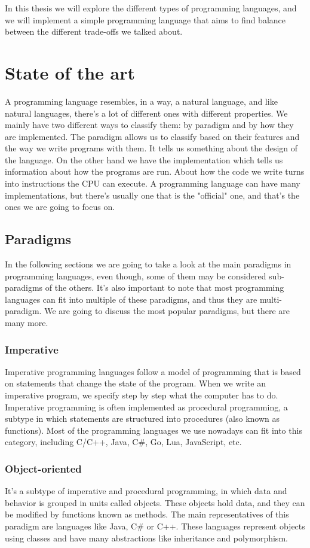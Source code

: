 ﻿\documentclass[10pt,a4paper,twocolumn,twoside]{article}
\begin{document}
In this thesis we will explore the different types of programming languages, and
we will implement a simple programming language that aims to find balance 
between the different trade-offs we talked about.

\section{State of the art}
A programming language resembles, in a way, a natural language, and like natural
languages, there's a lot of different ones with different properties. We mainly
have two different ways to classify them: by paradigm and by how they are
implemented. The paradigm allows us to classify based on their features and the
way we write programs with them. It tells us something about the design of the
language. On the other hand we have the implementation which tells us
information about how the programs are run. About how the code we write turns
into instructions the CPU can execute. A programming language can have many
implementations, but there's usually one that is the "official" one, and that's
the ones we are going to focus on.

\subsection{Paradigms}
In the following sections we are going to take a look at the main paradigms in
programming languages, even though, some of them may be considered sub-paradigms
of the others. It's also important to note that most programming languages can
fit into multiple of these paradigms, and thus they are multi-paradigm. We are
going to discuss the most popular paradigms, but there are many more.

\subsubsection{Imperative}
Imperative programming languages follow a model of programming that is based on
statements that change the state of the program. When we write an imperative 
program, we specify step by step what the computer has to do. Imperative 
programming is often implemented as procedural programming, a subtype in which
statements are structured into procedures (also known as functions). Most of
the programming languages we use nowadays can fit into this category, including
C/C++, Java, C\#, Go, Lua, JavaScript, etc.

\subsubsection{Object-oriented}
It's a subtype of imperative and procedural programming, in which data and
behavior is grouped in units called objects. These objects hold data, and they
can be modified by functions known as methods. The main representatives of this
paradigm are languages like Java, C\# or C++. These languages represent objects
using classes and have many abstractions like inheritance and polymorphism.
\end{document}
